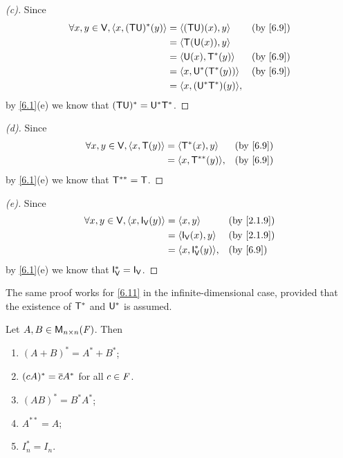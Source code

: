 \begin{proof}[(c)]
	Since
	\begin{align*}
		\forall x, y \in \V, \inn{x, (\T \U)^*(y)} & = \inn{(\T \U)(x), y}      &  & \by{6.9} \\
		                                           & = \inn{\T(\U(x)), y}                     \\
		                                           & = \inn{\U(x), \T^*(y)}     &  & \by{6.9} \\
		                                           & = \inn{x, \U^*(\T^*(y))}   &  & \by{6.9} \\
		                                           & = \inn{x, (\U^* \T^*)(y)},
	\end{align*}
	by \cref{6.1}(e) we know that \((\mathsf{T} \mathsf{U})^* = \mathsf{U}^* \mathsf{T}^*\).
\end{proof}

\begin{proof}[(d)]
	Since
	\begin{align*}
		\forall x, y \in \V, \inn{x, \T(y)} & = \inn{\T^*(x), y}     &  & \by{6.9} \\
		                                    & = \inn{x, \T^{**}(y)}, &  & \by{6.9}
	\end{align*}
	by \cref{6.1}(e) we know that \(\mathsf{T}^{**} = \mathsf{T}\).
\end{proof}

\begin{proof}[(e)]
	Since
	\begin{align*}
		\forall x, y \in \V, \inn{x, \IT[\V](y)} & = \inn{x, y}             &  & \by{2.1.9} \\
		                                         & = \inn{\IT[\V](x), y}    &  & \by{2.1.9} \\
		                                         & = \inn{x, \IT[\V]^*(y)}, &  & \by{6.9}
	\end{align*}
	by \cref{6.1}(e) we know that \(\IT[\V]^* = \IT[\V]\).
\end{proof}

\begin{note}
	The same proof works for \cref{6.11} in the infinite-dimensional case, provided that the existence of \(\mathsf{T}^*\) and \(\mathsf{U}^*\) is assumed.
\end{note}

\begin{cor}\label{6.3.2}
	Let \(A, B \in \mathsf{M}_{{n} \times n}({\mathit{F}})\).
	Then
	\begin{enumerate}
		\item \((A + B)^* = A^* + B^*\);
		\item \((cA)^* = \overline{c} A^*\) for all \(c \in \mathit{F}\).
		\item \((AB)^* = B^* A^*\);
		\item \(A^{**} = A\);
		\item \(I_n^* = I_n\).
	\end{enumerate}
\end{cor}

